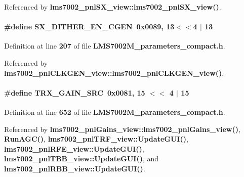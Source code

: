 Referenced by {\bf lms7002\+\_\+pnl\+S\+X\+\_\+view\+::lms7002\+\_\+pnl\+S\+X\+\_\+view()}.

\paragraph[{S\+X\+\_\+\+D\+I\+T\+H\+E\+R\+\_\+\+E\+N\+\_\+\+C\+G\+EN}]{\setlength{\rightskip}{0pt plus 5cm}\#define S\+X\+\_\+\+D\+I\+T\+H\+E\+R\+\_\+\+E\+N\+\_\+\+C\+G\+EN~0x0089, 13$<$$<$4 $\vert$  13}\label{LMS7002M__parameters__compact_8h_a0967ca5800ab7d735c6abd0c093b6cfa}


Definition at line {\bf 207} of file {\bf L\+M\+S7002\+M\+\_\+parameters\+\_\+compact.\+h}.



Referenced by {\bf lms7002\+\_\+pnl\+C\+L\+K\+G\+E\+N\+\_\+view\+::lms7002\+\_\+pnl\+C\+L\+K\+G\+E\+N\+\_\+view()}.

\paragraph[{T\+R\+X\+\_\+\+G\+A\+I\+N\+\_\+\+S\+RC}]{\setlength{\rightskip}{0pt plus 5cm}\#define T\+R\+X\+\_\+\+G\+A\+I\+N\+\_\+\+S\+RC~0x0081, 15 $<$$<$ 4 $\vert$ 15}\label{LMS7002M__parameters__compact_8h_a4b8d0aa2dc645e9cd34a9614d94e64c4}


Definition at line {\bf 652} of file {\bf L\+M\+S7002\+M\+\_\+parameters\+\_\+compact.\+h}.



Referenced by {\bf lms7002\+\_\+pnl\+Gains\+\_\+view\+::lms7002\+\_\+pnl\+Gains\+\_\+view()}, {\bf Run\+A\+G\+C()}, {\bf lms7002\+\_\+pnl\+T\+R\+F\+\_\+view\+::\+Update\+G\+U\+I()}, {\bf lms7002\+\_\+pnl\+R\+F\+E\+\_\+view\+::\+Update\+G\+U\+I()}, {\bf lms7002\+\_\+pnl\+T\+B\+B\+\_\+view\+::\+Update\+G\+U\+I()}, and {\bf lms7002\+\_\+pnl\+R\+B\+B\+\_\+view\+::\+Update\+G\+U\+I()}.

